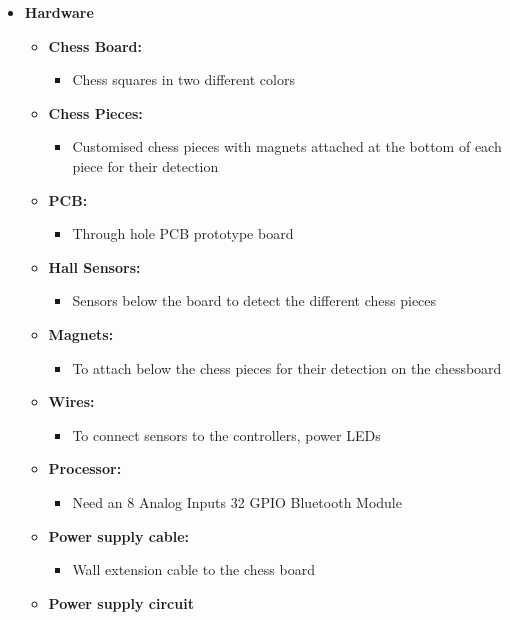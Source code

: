 \documentclass{article}
\begin{document}
\begin{itemize}
\item \textbf{Hardware}
\begin{itemize}
    \item \textbf{Chess Board:}
    \begin{itemize}
        \item Chess squares in two different colors
    \end{itemize}
    \item \textbf{Chess Pieces:}
    \begin{itemize}
        \item Customised chess pieces with magnets attached at the bottom of each piece for their detection
    \end{itemize}
    \item \textbf{PCB:}
    \begin{itemize}
        \item Through hole PCB prototype board
    \end{itemize}
    \item \textbf{Hall Sensors:}
    \begin{itemize}
        \item Sensors below the board to detect the different chess pieces
    \end{itemize}
    \item \textbf{Magnets:}
    \begin{itemize}
        \item To attach below the chess pieces for their detection on the chessboard
    \end{itemize}
    \item \textbf{Wires:}
    \begin{itemize}
        \item To connect sensors to the controllers, power LEDs
    \end{itemize}
    \item \textbf{Processor:}
    \begin{itemize}
        \item Need an 8 Analog Inputs 32 GPIO Bluetooth Module
    \end{itemize}
    \item \textbf{Power supply cable:}
    \begin{itemize}
        \item Wall extension cable to the chess board
    \end{itemize}
    \item \textbf{Power supply circuit}
    \begin{itemize}

\end{itemize}
\end{itemize}
\end{itemize}
\end{document}
